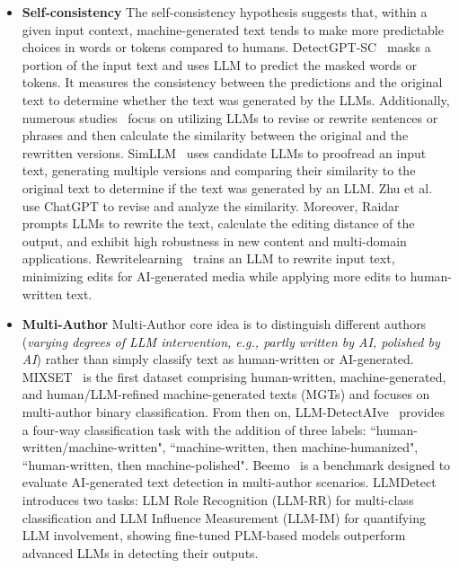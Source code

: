 \begin{itemize}
\item \textbf{Self-consistency}
The self-consistency hypothesis suggests that, within a given input context, machine-generated text tends to make more predictable choices in words or tokens compared to humans. DetectGPT-SC~\cite{wang2023detectgpt} masks a portion of the input text and uses LLM to predict the masked words or tokens. It measures the consistency between the predictions and the original text to determine whether the text was generated by the LLMs. Additionally, numerous studies~\cite{nguyen2024simllm,zhu2023beat,mao2024raidar, hao2024learning} focus on utilizing LLMs to revise or rewrite sentences or phrases and then calculate the similarity between the original and the rewritten versions. SimLLM~\cite{nguyen2024simllm} uses candidate LLMs to proofread an input text, generating multiple versions and comparing their similarity to the original text to determine if the text was generated by an LLM. Zhu et al.~\cite{zhu2023beat} use ChatGPT to revise and analyze the similarity. Moreover, Raidar~\cite{mao2024raidar} prompts LLMs to rewrite the text, calculate the editing distance of the output, and exhibit high robustness in new content and multi-domain applications. Rewritelearning~\cite{hao2024learning} trains an LLM to rewrite input text, minimizing edits for AI-generated media while applying more edits to human-written text.


\item \textbf{Multi-Author}
Multi-Author core idea is to distinguish different authors (\textit{varying degrees of LLM intervention, e.g., partly written by AI, polished by AI}) rather than simply classify text as human-written or AI-generated. 
MIXSET~\cite{zhang2024llm} is the first dataset comprising human-written, machine-generated, and
human/LLM-refined machine-generated texts (MGTs) and focuses on multi-author binary classification. From then on, LLM-DetectAIve~\cite{abassy2024llm} provides a four-way classification task with the addition of three labels: ``human-written/machine-written", ``machine-written, then machine-humanized", ``human-written, then machine-polished". Beemo~\cite{artemova2024beemo} is a benchmark designed to evaluate AI-generated text detection in multi-author scenarios. LLMDetect~\cite{cheng2024beyond} introduces two tasks: LLM Role Recognition (LLM-RR) for multi-class classification and LLM Influence Measurement (LLM-IM) for quantifying LLM involvement, showing fine-tuned PLM-based models outperform advanced LLMs in detecting their outputs. 


\end{itemize}
